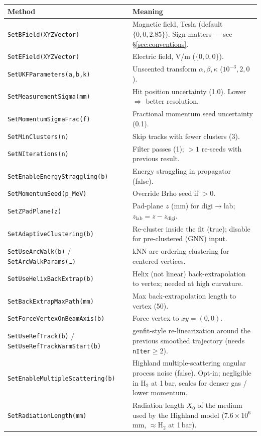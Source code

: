 \documentclass[11pt,a4paper]{article}
\newcommand{\code}[1]{\texttt{\small #1}}
\begin{document}
\begin{longtable}{@{}p{6.4cm} p{8.0cm}@{}}
\toprule
\textbf{Method} & \textbf{Meaning} \\
\midrule
\endhead
\code{SetBField(XYZVector)}            & Magnetic field, Tesla (default $\{0,0,2.85\}$). Sign matters --- see \S\ref{sec:conventions}. \\
\code{SetEField(XYZVector)}            & Electric field, V/m ($\{0,0,0\}$). \\
\code{SetUKFParameters(a,b,k)}         & Unscented transform $\alpha,\beta,\kappa$ ($10^{-3},2,0$). \\
\code{SetMeasurementSigma(mm)}         & Hit position uncertainty (1.0). Lower $\Rightarrow$ better resolution. \\
\code{SetMomentumSigmaFrac(f)}         & Fractional momentum seed uncertainty (0.1). \\
\code{SetMinClusters(n)}               & Skip tracks with fewer clusters (3). \\
\code{SetNIterations(n)}               & Filter passes (1); $>1$ re-seeds with previous result. \\
\code{SetEnableEnergyStraggling(b)}    & Energy straggling in propagator (false). \\
\code{SetMomentumSeed(p\_MeV)}         & Override Brho seed if $>0$. \\
\code{SetZPadPlane(z)}                 & Pad-plane $z$ (mm) for digi$\rightarrow$lab; $z_\mathrm{lab}=z-z_\mathrm{digi}$. \\
\code{SetAdaptiveClustering(b)}        & Re-cluster inside the fit (true); disable for pre-clustered (GNN) input. \\
\code{SetUseArcWalk(b)} / \code{SetArcWalkParams(\dots)} & kNN arc-ordering clustering for centered vertices. \\
\code{SetUseHelixBackExtrap(b)}        & Helix (not linear) back-extrapolation to vertex; needed at high curvature. \\
\code{SetBackExtrapMaxPath(mm)}        & Max back-extrapolation length to vertex (50). \\
\code{SetForceVertexOnBeamAxis(b)}     & Force vertex to $xy=(0,0)$. \\
\code{SetUseRefTrack(b)} / \code{SetUseRefTrackWarmStart(b)} & genfit-style re-linearization around the previous smoothed trajectory (needs \code{nIter}$\ge 2$). \\
\code{SetEnableMultipleScattering(b)}  & Highland multiple-scattering angular process noise (false). Opt-in; negligible in H$_2$ at 1\,bar, scales for denser gas / lower momentum. \\
\code{SetRadiationLength(mm)}          & Radiation length $X_0$ of the medium used by the Highland model ($7.6\times10^{6}$\,mm, $\approx$H$_2$ at 1\,bar). \\
\bottomrule
\end{longtable}
\end{document}
